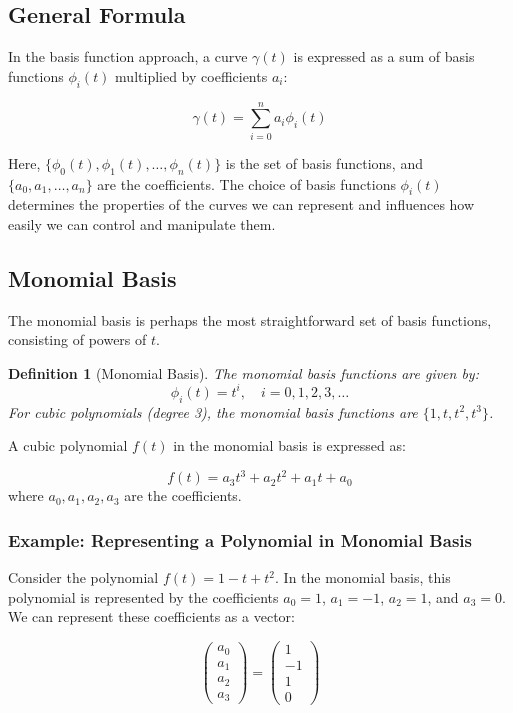 \documentclass{article}
\newtheorem{definition}{Definition}
\begin{document}
\subsection{General Formula}

In the basis function approach, a curve \(\gamma(t)\) is expressed as a sum of basis functions \(\phi_i(t)\) multiplied by coefficients \(a_i\):

\begin{equation}
\gamma(t) = \sum_{i=0}^{n} a_i \phi_i(t)
\end{equation}

Here, \(\{\phi_0(t), \phi_1(t), \ldots, \phi_n(t)\}\) is the set of basis functions, and \(\{a_0, a_1, \ldots, a_n\}\) are the coefficients.  The choice of basis functions \(\phi_i(t)\) determines the properties of the curves we can represent and influences how easily we can control and manipulate them.

\subsection{Monomial Basis}

The monomial basis is perhaps the most straightforward set of basis functions, consisting of powers of \(t\).

\begin{definition}[Monomial Basis]
The monomial basis functions are given by:
\[ \phi_i(t) = t^i, \quad i = 0, 1, 2, 3, \ldots \]
For cubic polynomials (degree 3), the monomial basis functions are \( \{1, t, t^2, t^3\} \).
\end{definition}

A cubic polynomial \(f(t)\) in the monomial basis is expressed as:

\begin{equation}
f(t) = a_3 t^3 + a_2 t^2 + a_1 t + a_0
\end{equation}
where \(a_0, a_1, a_2, a_3\) are the coefficients.

\subsubsection{Example: Representing a Polynomial in Monomial Basis}

Consider the polynomial \(f(t) = 1 - t + t^2\). In the monomial basis, this polynomial is represented by the coefficients \(a_0 = 1\), \(a_1 = -1\), \(a_2 = 1\), and \(a_3 = 0\).  We can represent these coefficients as a vector:

\[ \begin{pmatrix} a_0 \\ a_1 \\ a_2 \\ a_3 \end{pmatrix} = \begin{pmatrix} 1 \\ -1 \\ 1 \\ 0 \end{pmatrix} \]
\end{document}
